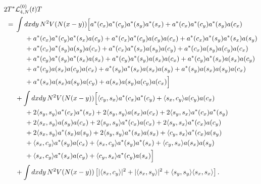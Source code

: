 \documentclass[11pt,a4paper]{article}
\newcommand{\cL}{{\cal L}}
\begin{document}
\begin{equation}\label{eq:TL4T} \begin{split} 
2T^* & \cL_{4,N}^{(0)} (t) T \\ =  \; & \int dx dy \, N^2 V (N (x-y)) \Big[ a^* (c_x) a^* (c_y) a^* (s_y) a^* (s_x) + a^* (c_x) a^* (c_y) a^* (s_y) a (c_x)  \\ &\hspace{.5cm} + a^* (c_x) a^* (c_y) a^* (s_x) a(c_y)  + a^* (c_x) a^* (c_y) a (c_y) a (c_x) + a^* (c_x)  a^* (s_y) a^* (s_x) a (s_y)  \\ &\hspace{.5cm}  
+ a^* (c_x) a^* (s_y) a (s_y) a (c_x) + a^* (c_x)  a^* (s_x)  a (s_y) a(c_y) + a^* (c_x) a (s_y) a (c_y) a (c_x)  \\ &\hspace{.5cm}  + a^* (c_y) a^* (s_y) a^* (s_x)  a (s_x) + a^* (c_y) a^* (s_y)  a (s_x) a (c_x) 
+  a^* (c_y)  a^* (s_x) a (s_x) a(c_y)  \\ &\hspace{.5cm}  + a^* (c_y)  a (s_x)  a (c_y) a (c_x) + a^* (s_y)   a^* (s_x) a (s_x) a (s_y) + a^* (s_y)  a (s_x) a (s_y) a (c_x)  \\ &\hspace{.5cm}  + a^* (s_x) a (s_x) a (s_y) a(c_y)  + a (s_x) a (s_y) a (c_y) a (c_x) \Big] \\
&+ \int dx dy \, N^2 V (N (x-y))  \Big[ \langle c_y, s_x \rangle a^* (c_x) a^* (c_y) + \langle s_x, c_y \rangle a (c_y)  a(c_x)   \\ &\hspace{.5cm} + 2 \langle s_y, s_y \rangle a^* (c_x)  a^* (s_x) + 2 \langle s_y, s_y \rangle a (s_x) a (c_x) 
+ 2 \langle s_y, s_x \rangle a^* (c_x)  a^* (s_y)   \\ &\hspace{.5cm}
+ 2\langle s_x , s_y \rangle a (s_y) a (c_x) + 2 \langle s_y, s_y \rangle   a^* (c_x) a (c_x) 
+ 2 \langle s_y , s_x \rangle a^* (c_x) a(c_y) 
  \\ &\hspace{.5cm} + 2 \langle s_x , s_y \rangle  a^* (s_x)  a (s_y) 
+ 2 \langle s_y , s_y \rangle  a^* (s_x)  a (s_x) +  \langle c_y , s_x \rangle  a^* (c_x)   a (s_y)   \\ &\hspace{.5cm} + \langle s_x, c_y \rangle a^* (s_y) a (c_x) 
+  \langle s_x , c_y \rangle a^* (s_y) a^* (s_x)   + \langle c_y , s_x \rangle a (s_x) a (s_y)  
  \\ &\hspace{.5cm} + \langle s_x , c_y \rangle a^* (s_x) a(c_y)  + \langle c_y, s_x \rangle  a^* (c_y) a (s_x) \Big] \\
&+ \int dx dy \, N^2 V (N (x-y)) \left[ |\langle s_x , c_y \rangle|^2  +  |\langle s_x , s_y \rangle|^2   
+ \langle s_y , s_y \rangle \langle s_x ,s_x \rangle \right]. 
\end{split} \end{equation}
\end{document}
